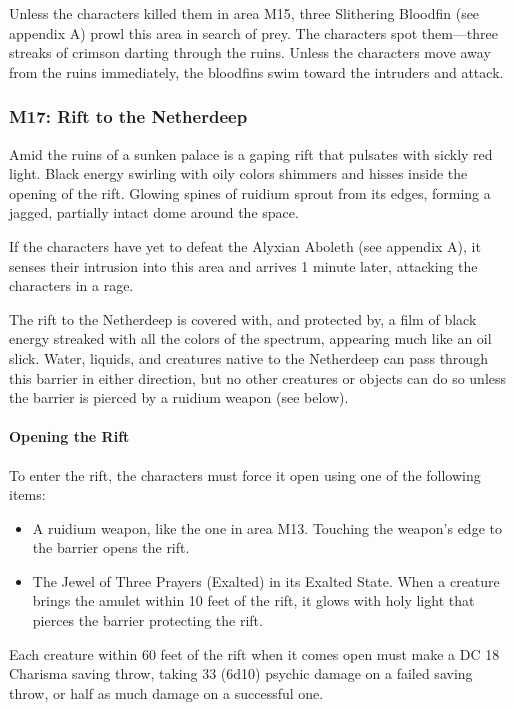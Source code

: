 \documentclass[10pt,a4paper,twoside,twocolumn,openany,nodeprecatedcode]{dndbook}
\begin{document}
Unless the characters killed them in area M15, three Slithering Bloodfin (see appendix A) prowl this area in search of prey. The characters spot them—three streaks of crimson darting through the ruins. Unless the characters move away from the ruins immediately, the bloodfins swim toward the intruders and attack.

\subsubsection{M17: Rift to the Netherdeep}
\begin{DndReadAloud}{}
Amid the ruins of a sunken palace is a gaping rift that pulsates with sickly red light. Black energy swirling with oily colors shimmers and hisses inside the opening of the rift. Glowing spines of ruidium sprout from its edges, forming a jagged, partially intact dome around the space.

\end{DndReadAloud}

If the characters have yet to defeat the Alyxian Aboleth (see appendix A), it senses their intrusion into this area and arrives 1 minute later, attacking the characters in a rage.

The rift to the Netherdeep is covered with, and protected by, a film of black energy streaked with all the colors of the spectrum, appearing much like an oil slick. Water, liquids, and creatures native to the Netherdeep can pass through this barrier in either direction, but no other creatures or objects can do so unless the barrier is pierced by a ruidium weapon (see below).

\paragraph{Opening the Rift}
To enter the rift, the characters must force it open using one of the following items:


\begin{itemize}
\item A ruidium weapon, like the one in area M13. Touching the weapon's edge to the barrier opens the rift.
\item The Jewel of Three Prayers (Exalted) in its Exalted State. When a creature brings the amulet within 10 feet of the rift, it glows with holy light that pierces the barrier protecting the rift.
\end{itemize}

Each creature within 60 feet of the rift when it comes open must make a DC 18 Charisma saving throw, taking 33 (6d10) psychic damage on a failed saving throw, or half as much damage on a successful one.
\end{document}
